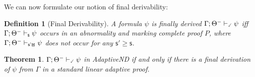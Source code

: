 \documentclass[]{article}
\newtheorem{definition}{Definition}
\newtheorem{theorem}{Theorem}
\newcommand{\Turn}[2]
    { {#1}\vdash_{\textbf{\sf s}}  {#2}}
\newcommand{\TurnChecked}[2]
    { {#1}\vdash_{\textbf{\sf \checked}}  {#2}}
\newcommand{\TurnMarkedprime}[2]
    { {#1}\vdash_{\textbf{\sf s'\XBox}}  {#2}}
\begin{document}
We can now formulate our notion of final derivability:

\begin{definition}[Final Derivability]\label{def:finalder}
A formula $\psi$ is finally derived $\TurnChecked{\Gamma;\Theta^{-}}{\psi}$ iff $\Turn{\Gamma; \Theta^-}{\psi}$ occurs in an abnormality and marking complete proof $P$, where $\TurnMarkedprime{\Gamma; \Theta^-}{\psi}$ does not occur for any $\mathsf{s'} \geq \mathsf{s}$.
\end{definition}
%



\begin{theorem}
$\TurnChecked{\Gamma;\Theta^{-}}{\psi}$ in {\sf AdaptiveND} if and only if there is a final derivation of $\psi$ from $\Gamma$ in a standard linear adaptive proof.
\end{theorem}
\end{document}
